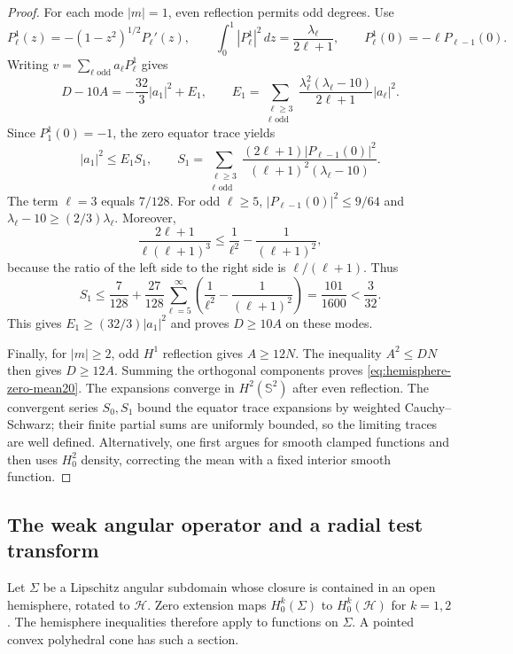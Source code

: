 \documentclass[11pt,a4paper]{article}
\theoremstyle{remark}
\numberwithin{equation}{section}
\begin{document}
\begin{proof}
For each mode $|m|=1$, even reflection permits odd degrees. Use
\[
 P_\ell^1(z)=-(1-z^2)^{1/2}P_\ell'(z),\qquad
 \int_0^1|P_\ell^1|^2\,dz=\frac{\lambda_\ell}{2\ell+1},\qquad
 P_\ell^1(0)=-\ell P_{\ell-1}(0).
\]
Writing $v=\sum_{\ell\text{ odd}}a_\ell P_\ell^1$ gives
\[
 D-10A=-\frac{32}{3}|a_1|^2+E_1,
 \qquad
 E_1=\sum_{\substack{\ell\ge3\\\ell\text{ odd}}}
 \frac{\lambda_\ell^2(\lambda_\ell-10)}{2\ell+1}|a_\ell|^2.
\]
Since $P_1^1(0)=-1$, the zero equator trace yields
\[
 |a_1|^2\le E_1S_1,
 \qquad
 S_1=\sum_{\substack{\ell\ge3\\\ell\text{ odd}}}
 \frac{(2\ell+1)|P_{\ell-1}(0)|^2}
      {(\ell+1)^2(\lambda_\ell-10)}.
\]
The term $\ell=3$ equals $7/128$. For odd $\ell\ge5$,
$|P_{\ell-1}(0)|^2\le9/64$ and
$\lambda_\ell-10\ge(2/3)\lambda_\ell$. Moreover,
\[
 \frac{2\ell+1}{\ell(\ell+1)^3}
 \le\frac1{\ell^2}-\frac1{(\ell+1)^2},
\]
because the ratio of the left side to the right side is $\ell/(\ell+1)$.
Thus
\[
 S_1\le\frac7{128}+\frac{27}{128}
 \sum_{\ell=5}^\infty
 \left(\frac1{\ell^2}-\frac1{(\ell+1)^2}\right)
 =\frac{101}{1600}<\frac3{32}.
\]
This gives $E_1\ge(32/3)|a_1|^2$ and proves $D\ge10A$ on these modes.

Finally, for $|m|\ge2$, odd $H^1$ reflection gives $A\ge12N$.
The inequality $A^2\le DN$ then gives $D\ge12A$.
Summing the orthogonal components proves \eqref{eq:hemisphere-zero-mean20}.
The expansions converge in $H^2(\mathbb S^2)$ after even reflection.
The convergent series $S_0,S_1$ bound the equator trace
expansions by weighted Cauchy--Schwarz; their finite partial sums
are uniformly bounded, so the limiting traces are well defined. Alternatively,
one first argues for smooth clamped functions and then uses $H_0^2$
density, correcting the mean with a fixed interior smooth function.
\end{proof}

\subsection{The weak angular operator and a radial test transform}

Let $\Sigma$ be a Lipschitz angular subdomain whose closure is contained in
an open hemisphere, rotated to $\mathcal H$. Zero extension maps
$H_0^k(\Sigma)$ to $H_0^k(\mathcal H)$ for $k=1,2$. The hemisphere
inequalities therefore apply to functions on $\Sigma$. A pointed convex
polyhedral cone has such a section.
\end{document}
